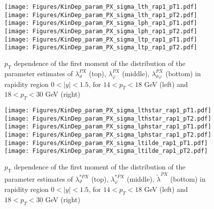 \documentclass[12pt]{article}
\newcommand{\pT}{p_\mathrm{T}}
\newcommand{\absy}{\left |  y \right |}
\newcommand{\lamthPX}{\lambda^{\scriptscriptstyle PX}_\vartheta}
\newcommand{\lamphPX}{\lambda^{\scriptscriptstyle PX}_\varphi}
\newcommand{\lamthphPX}{\lambda^{\scriptscriptstyle PX}_{\vartheta \varphi}}
\newcommand{\lamtildePX}{\tilde{\lambda}^{\scriptscriptstyle PX}}
\newcommand{\lamthstarPX}{\lambda^{* \scriptscriptstyle PX}_\vartheta}
\newcommand{\lamphstarPX}{\lambda^{* \scriptscriptstyle PX}_\varphi}
\begin{document}
\begin{figure}[htbp]
\centering
\texttt{[image: Figures/KinDep\_param\_PX\_sigma\_lth\_rap1\_pT1.pdf]}
\texttt{[image: Figures/KinDep\_param\_PX\_sigma\_lth\_rap1\_pT2.pdf]}
\texttt{[image: Figures/KinDep\_param\_PX\_sigma\_lph\_rap1\_pT1.pdf]}
\texttt{[image: Figures/KinDep\_param\_PX\_sigma\_lph\_rap1\_pT2.pdf]}
\texttt{[image: Figures/KinDep\_param\_PX\_sigma\_ltp\_rap1\_pT1.pdf]}
\texttt{[image: Figures/KinDep\_param\_PX\_sigma\_ltp\_rap1\_pT2.pdf]}
\caption{$\pT$ dependence of the first moment of the distribution of the parameter estimates of $\lamthPX$ (top), $\lamphPX$ (middle), $\lamthphPX$ (bottom) in rapidity region $0<\absy<1.5$, for $14 < p_T < 18$ GeV (left) and
$18 < p_T < 30$ GeV (right)}
\end{figure}
\clearpage

\begin{figure}[htbp]
\centering
\texttt{[image: Figures/KinDep\_param\_PX\_sigma\_lthstar\_rap1\_pT1.pdf]}
\texttt{[image: Figures/KinDep\_param\_PX\_sigma\_lthstar\_rap1\_pT2.pdf]}
\texttt{[image: Figures/KinDep\_param\_PX\_sigma\_lphstar\_rap1\_pT1.pdf]}
\texttt{[image: Figures/KinDep\_param\_PX\_sigma\_lphstar\_rap1\_pT2.pdf]}
\texttt{[image: Figures/KinDep\_param\_PX\_sigma\_ltilde\_rap1\_pT1.pdf]}
\texttt{[image: Figures/KinDep\_param\_PX\_sigma\_ltilde\_rap1\_pT2.pdf]}
\caption{$\pT$ dependence of the first moment of the distribution of the parameter estimates of $\lamthstarPX$ (top), $\lamphstarPX$ (middle), $\lamtildePX$ (bottom) in rapidity region $0<\absy<1.5$, for $14 < p_T < 18$ GeV (left) and
$18 < p_T < 30$ GeV (right)}
\end{figure}
\clearpage
\end{document}

